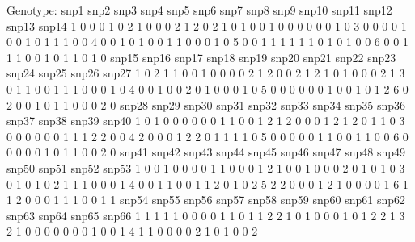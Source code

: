 \documentclass{article}
\begin{document}
\begin{Schunk}
\begin{Soutput}
Genotype:
  snp1 snp2 snp3 snp4 snp5 snp6 snp7 snp8 snp9 snp10 snp11 snp12 snp13 snp14
1    0    0    0    1    0    2    1    0    0     0     2     1     2     0
2    1    0    1    0    0    1    0    0    0     0     0     0     1     0
3    0    0    0    0    1    0    0    1    0     1     1     1     0     0
4    0    0    1    0    1    0    0    1    1     0     0     0     1     0
5    0    0    1    1    1    1    1    1    0     1     0     1     0     0
6    0    0    1    1    1    0    0    1    0     1     1     0     1     0
  snp15 snp16 snp17 snp18 snp19 snp20 snp21 snp22 snp23 snp24 snp25 snp26 snp27
1     0     2     1     1     0     0     1     0     0     0     0     2     1
2     0     0     2     1     2     1     0     1     0     0     0     2     1
3     0     1     1     0     0     1     1     1     0     0     0     1     0
4     0     0     1     0     0     2     0     1     0     0     0     1     0
5     0     0     0     0     0     0     1     0     0     1     0     1     2
6     0     2     0     0     1     0     1     1     0     0     0     2     0
  snp28 snp29 snp30 snp31 snp32 snp33 snp34 snp35 snp36 snp37 snp38 snp39 snp40
1     0     1     0     0     0     0     0     0     1     1     0     0     1
2     1     2     0     0     0     1     2     1     2     0     1     1     0
3     0     0     0     0     0     0     1     1     1     2     2     0     0
4     2     0     0     0     1     2     2     0     1     1     1     1     0
5     0     0     0     0     0     1     1     0     0     1     1     0     0
6     0     0     0     0     0     1     0     1     1     0     0     2     0
  snp41 snp42 snp43 snp44 snp45 snp46 snp47 snp48 snp49 snp50 snp51 snp52 snp53
1     0     0     1     0     0     0     0     1     1     0     0     0     1
2     1     0     0     1     0     0     0     2     0     1     0     1     0
3     0     1     0     1     0     2     1     1     1     0     0     0     1
4     0     0     1     1     0     0     1     1     2     0     1     0     2
5     2     2     0     0     0     1     2     1     0     0     0     0     1
6     1     1     2     0     0     0     1     1     1     0     0     1     1
  snp54 snp55 snp56 snp57 snp58 snp59 snp60 snp61 snp62 snp63 snp64 snp65 snp66
1     1     1     1     1     0     0     0     0     1     1     0     1     1
2     2     1     0     1     0     0     0     1     0     1     2     2     1
3     2     1     0     0     0     0     0     0     0     1     0     0     1
4     1     1     0     0     0     0     2     1     0     1     0     0     2

\end{Soutput}
\end{Schunk}
\end{document}
